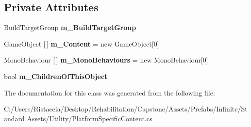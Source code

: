 \subsection*{Private Attributes}
\begin{DoxyCompactItemize}
\item 
\mbox{\label{class_unity_standard_assets_1_1_utility_1_1_platform_specific_content_ab8acfbb9038de3ba601c648ee2082cc3}} 
Build\+Target\+Group {\bfseries m\+\_\+\+Build\+Target\+Group}
\item 
\mbox{\label{class_unity_standard_assets_1_1_utility_1_1_platform_specific_content_a63f354968c0da07c67193b97ef7cae96}} 
Game\+Object \mbox{[}$\,$\mbox{]} {\bfseries m\+\_\+\+Content} = new Game\+Object\mbox{[}0\mbox{]}
\item 
\mbox{\label{class_unity_standard_assets_1_1_utility_1_1_platform_specific_content_a4fa439eec57ec97ab8eb6749a7009a1a}} 
Mono\+Behaviour \mbox{[}$\,$\mbox{]} {\bfseries m\+\_\+\+Mono\+Behaviours} = new Mono\+Behaviour\mbox{[}0\mbox{]}
\item 
\mbox{\label{class_unity_standard_assets_1_1_utility_1_1_platform_specific_content_ac62c7f41d9cd2c33c09bbbdeeb48a7ac}} 
bool {\bfseries m\+\_\+\+Children\+Of\+This\+Object}
\end{DoxyCompactItemize}


The documentation for this class was generated from the following file\+:\begin{DoxyCompactItemize}
\item 
C\+:/\+Users/\+Ristaccia/\+Desktop/\+Rehabilitation/\+Capstone/\+Assets/\+Prefabs/\+Infinite/\+Standard Assets/\+Utility/Platform\+Specific\+Content.\+cs\end{DoxyCompactItemize}
